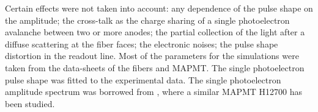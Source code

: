 \documentclass{webofc}
\begin{document}
Certain effects were not taken into account: any dependence of the pulse shape on the amplitude; the cross-talk as the charge sharing of a single photoelectron avalanche between two or more anodes; the partial collection of the light after a diffuse scattering at the fiber faces; the electronic noises; the pulse shape distortion in the readout line. Most of the parameters for the simulations were taken from the data-sheets of the fibers and MAPMT. The single photoelectron pulse shape was fitted to the experimental data. The single photoelectron amplitude spectrum was borrowed from \cite{adam2018}, where a similar MAPMT H12700 has been studied.

\end{document}
